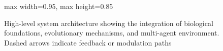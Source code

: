 \begin{figure}[htbp]
\begin{adjustbox}{max width=0.95\textwidth, max height=0.85\textheight}
\end{adjustbox}
\caption{High-level system architecture showing the integration of biological foundations, evolutionary mechanisms, and multi-agent environment. Dashed arrows indicate feedback or modulation paths}
\label{fig:system-architecture}
\end{figure}